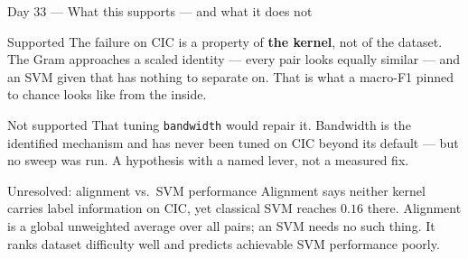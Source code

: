\documentclass[aspectratio=169,11pt]{beamer}
\newcommand{\daytag}[1]{{\color{blue!55!black}Day #1} --- }
\begin{document}
\begin{frame}{\daytag{33}What this supports --- and what it does not}
\small
\begin{block}{Supported}
The failure on CIC is a property of \textbf{the kernel}, not of the dataset.
The Gram approaches a scaled identity --- every pair looks equally similar ---
and an SVM given that has nothing to separate on. That is what a macro-F1
pinned to chance looks like from the inside.
\end{block}

\begin{block}{Not supported}
That tuning \texttt{bandwidth} would repair it. Bandwidth is the identified
mechanism and has never been tuned on CIC beyond its default --- but no sweep
was run. A hypothesis with a named lever, not a measured fix.
\end{block}

\begin{block}{Unresolved: alignment vs.\ SVM performance}
Alignment says neither kernel carries label information on CIC, yet classical
SVM reaches $0.16$ there. Alignment is a global unweighted average over all
pairs; an SVM needs no such thing. It ranks dataset difficulty well and predicts
achievable SVM performance poorly.
\end{block}
\end{frame}
\end{document}
